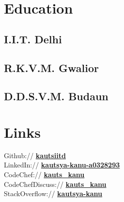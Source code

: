 \documentclass[]{Kauts}
\begin{document}
%
%

%
%

\begin{minipage}[t]{0.3\textwidth} 


\section{Education} 

\subsection{I.I.T. Delhi}

\subsection{}
\sectionsep

\subsection{R.K.V.M. Gwalior}
\sectionsep

\subsection{D.D.S.V.M. Budaun}


\section{Links}
Github:// \href{https://github.com/kautsiitd}{\bf kautsiitd} \\
LinkedIn://  \href{https://www.linkedin.com/in/kautsya-kanu-a0328293}{\bf kautsya-kanu-a0328293} \\
CodeChef://  \href{https://www.codechef.com/users/kauts\_kanu}{\bf kauts\_kanu} \\
CodeChefDiscuss://  \href{https://discuss.codechef.com/users/70101/kauts\_kanu}{\bf kauts\_kanu} \\
StackOverflow://  \href{https://stackoverflow.com/users/4614493/kautsya-kanu?tab=profile}{\bf kautsya-kanu}


\end{minipage}
\end{document}
